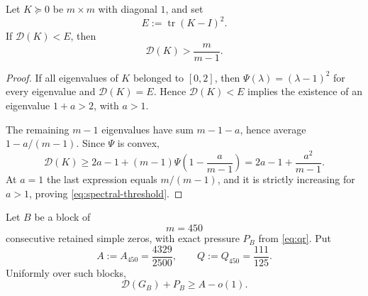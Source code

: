 \begin{lemma}\label{lem:spectral-threshold}
Let \(K\succeq0\) be \(m\times m\) with diagonal \(1\), and set
\[
 E:=\operatorname{tr}(K-I)^2.
\]
If \(\mathcal D(K)<E\), then
\begin{equation}\label{eq:spectral-threshold}
 \mathcal D(K)>\frac{m}{m-1}.
\end{equation}
\end{lemma}

\begin{proof}
If all eigenvalues of \(K\) belonged to \([0,2]\), then
\(\Psi(\lambda)=(\lambda-1)^2\) for every eigenvalue and
\(\mathcal D(K)=E\).  Hence \(\mathcal D(K)<E\) implies the existence of
an eigenvalue \(1+a>2\), with \(a>1\).

The remaining \(m-1\) eigenvalues have sum \(m-1-a\), hence average
\(1-a/(m-1)\).  Since \(\Psi\) is convex,
\[
 \mathcal D(K)
 \ge
 2a-1
 +(m-1)\Psi\!\left(1-\frac{a}{m-1}\right)
 =
 2a-1+\frac{a^2}{m-1}.
\]
At \(a=1\) the last expression equals \(m/(m-1)\), and it is strictly
increasing for \(a>1\), proving \eqref{eq:spectral-threshold}.
\end{proof}


\begin{proposition}[Strong block stability at \(m=450\)]
\label{prop:blockstab450}
Let \(B\) be a block of
\[
 m=450
\]
consecutive retained simple zeros, with exact pressure \(P_B\) from
\eqref{eq:qr}.  Put
\begin{equation}\label{eq:AQ450}
 A:=A_{450}=\frac{4329}{2500},
 \qquad
 Q:=Q_{450}=\frac{111}{125}.
\end{equation}
Uniformly over such blocks,
\begin{equation}\label{eq:blockstab450}
 \boxed{\mathcal D(G_B)+P_B\ge A-o(1)}.
\end{equation}
\end{proposition}

